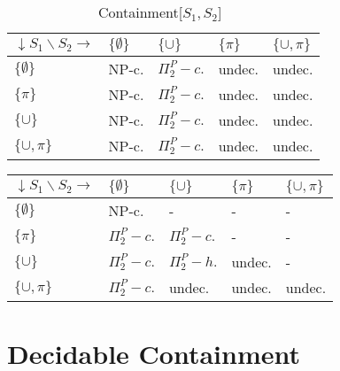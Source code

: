 \begin{table}
	\begin{minipage}[b]{0.5\hsize}
		\begin{tabular}{|l | l | l | l | l|}
			\hline
			$\downarrow S_1 \backslash S_2 \rightarrow$ & $\{\emptyset\}$  &
			$\{\cup\}$& $\{\pi \}$ & $\{\cup,\pi \}$ \\
			\hline
			$\{\emptyset\}$           & NP-c.	& $\Pi^P_2-c.$  & undec. & undec. \\
			$\{\pi \}$       & NP-c.	& $\Pi^P_2-c.$  & undec. & undec. \\
			$\{\cup \}$      & NP-c.	& $\Pi^P_2-c.$  & undec. & undec. \\
			$\{\cup,\pi \}$ & NP-c.	& $\Pi^P_2-c.$  & undec. & undec. \\
			\hline
		\end{tabular}
		\caption{Containment[$S_1,S_2$]~\cite{pichler2014containment}}
		\label{conttable}
	\end{minipage}
\end{table}

\bigskip
\begin{table}
	\begin{minipage}[b]{0.5\hsize}
\begin{tabular}{|l |  l | l | l | l|}
	\hline
	$\downarrow S_1 \backslash S_2 \rightarrow$ & $\{\emptyset\}$ &
	$\{\cup\}$& $\{\pi \}$ & $\{\cup,\pi \}$ \\
	\hline
	$\{\emptyset\}$			&  NP-c.				& -				 & -         & - \\
	$\{\pi \}$		&  $\Pi^P_2-c.$ 		& $\Pi^P_2-c.$   & -		 & - \\
	$\{\cup \}$		&  $\Pi^P_2-c.$ 		& $\Pi^P_2-h.$   & undec.    & - \\
	$\{\cup,\pi \}$&  $\Pi^P_2-c.$ 		& undec.         & undec.    & undec. \\
\hline
\end{tabular}
\label{equivtable}
	\end{minipage}
\end{table}


\section{Decidable Containment}\label{section:decidablecontainment}

